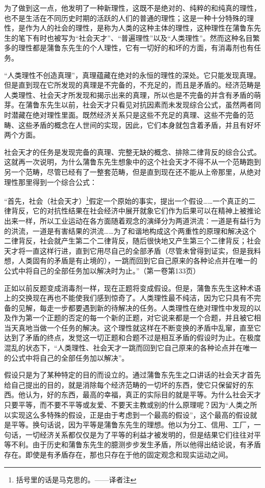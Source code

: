 \documentclass[a4paper,twoside,12pt,AutoFakeBold]{ctexart}
\begin{document}
为了做到这一点，他发明了一种新理性，这既不是绝对的、纯粹的和纯真的理性，也不是生活在不同历史时期的活跃的人们的普通的理性；这是一种十分特殊的理性，是作为人的社会的理性，是称为人类的这种主体的理性，这种理性在蒲鲁东先生的笔下有时也被写为“社会天才”、“普遍理性”以及“人类理性”。然而这种名目繁多的理性都是蒲鲁东先生的个人理性，它有一切好的和坏的方面，有消毒剂也有任务。

“人类理性不创造真理”，真理蕴藏在绝对的永恒的理性的深处。它只能发现真理。但是直到现在它所发现的真理是不完备的，不充足的，而且是矛盾的。经济范畴是人类理性、社会天才所发现和揭示出来的真理，所以也是不完备的并含有矛盾的萌芽。在蒲鲁东先生以前，社会天才只看见对抗因素而未发现综合公式，虽然两者同时潜藏在绝对理性里面。既然经济关系只是这些不充足的真理、这些不完备的范畴、这些矛盾的概念在人世间的实现，因此，它们本身就包含着矛盾，并且有好坏两个方面。

社会天才的任务是发现完备的真理、完整无缺的概念、排除二律背反的综合公式。这就再一次说明，为什么蒲鲁东先生想象中的这个社会天才不得不从一个范畴跑到另一个范畴，尽管已经有了一整套范畴，但是直到现在还不能从上帝那里，从绝对理性那里得到一个综合公式：

\begin{fangsong}
    “首先，社会（社会天才）\footnote{括号里的话是马克思的。——译者注}假定一个原始的事实，提出一个假设……一个真正的二律背反，它的对抗性结果在社会经济中展开就象它们作为后果可以在精神上被推论出来一样，所以工业运动在各方面随着观念的演绎分为两道洪流：一道是有益行为的洪流，一道是有害结果的洪流……为了和谐地构成这个两重性的原理和解决这个二律背反，社会就产生第二个二律背反，随后很快地又产生第三个二律背反；社会天才将一直这样行进，直到它用尽自己的全部矛盾（尽管未曾得到证实，但是我料想，人类固有的矛盾是有止境的），一跳而回到它自己原来的各种论点并在唯一的公式中将自己的全部任务加以解决时为止。”（第一卷第133页）
\end{fangsong}

正如以前反题变成消毒剂一样，现在正题将变成假设。但是，蒲鲁东先生这种术语上的交换现在再也不能使我们感到惊奇了。人类理性最不纯洁，因为它只具有不完备的见解，每走一步都要遇到新的待解决的任务。人类理性在绝对理性中发现的以及作为第一个正题的否定的每一个新的正题，对它说来都是一个合题，并且被它相当天真地当做一个任务的解决。这个理性就这样在不断变换的矛盾中乱窜，直至它达到了矛盾的终点，发觉这一切正题和合题不过是相互矛盾的假设时为止。在极度混乱的状态下，“人类理性、社会天才一跳而回到它自己原来的各种论点并在唯一的公式中将自己的全部任务加以解决”。

假设只是为了某种特定的目的而设立的。通过蒲鲁东先生之口讲话的社会天才首先给自己提出的目的，就是消除每个经济范畴的一切坏的东西，使它只保留好的东西。他认为，好的东西，最高的幸福，真正的实际目的就是平等。为什么社会天才只要平等，而不要不平等或友爱、不要天主教或别的什么原理呢？因为“人类之所以实现这么多特殊的假设，正是由于考虑到一个最高的假设”，这个最高的假设就是平等。换句话说，因为平等是蒲鲁东先生的理想。他以为分工、信用、工厂，一句话，一切经济关系都仅仅是为了平等的利益才被发明的，但是结果它们往往对平等不利。由于历史和蒲鲁东先生的臆测步步发生矛盾，所以他得出结论说，有矛盾存在。即使是有矛盾存在，那也只存在于他的固定观念和现实运动之间。
\end{document}
